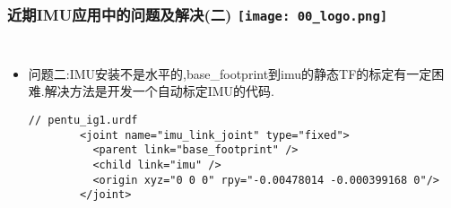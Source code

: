 \begin{frame}[fragile]
  \frametitle{近期IMU应用中的问题及解决(二) \hfill \texttt{[image: 00\_logo.png]}}
  \begin{columns}
    
    \begin{itemize}
      \item 问题二:IMU安装不是水平的,base\_footprint到imu的静态TF的标定有一定困难.解决方法是开发一个自动标定IMU的代码.

      
      \begin{lstlisting}[frame=shadowbox]  
        // pentu_ig1.urdf
        <joint name="imu_link_joint" type="fixed">
          <parent link="base_footprint" />
          <child link="imu" />
          <origin xyz="0 0 0" rpy="-0.00478014 -0.000399168 0"/>
        </joint>

      \end{lstlisting}

    \end{itemize}
    

  
  \end{columns}
  \end{frame}   


